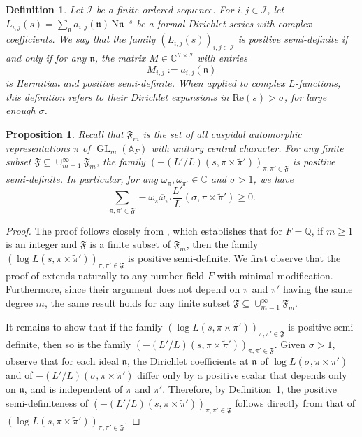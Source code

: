 \documentclass[12pt,reqno]{amsart}
\renewcommand{\tilde}{\widetilde}
\newtheorem{prop}[thm]{Proposition}
\newtheorem{defi}[thm]{Definition}
\theoremstyle{remark}
\renewcommand{\tilde}{\widetilde}
\DeclareMathOperator{\GL}{GL}
\renewcommand{\tilde}{\widetilde}
\renewcommand{\Re}{\mathrm{Re}}
\newcommand{\N}{\mathrm{N}}
\newcommand{\kn}{\mathfrak{n}}
\numberwithin{equation}{section}
\begin{document}
   \begin{defi}\label{def:nonneg-def}
Let $\mathcal{I}$ be a finite ordered sequence. For $i, j \in \mathcal{I}$, let $L_{i,j}(s) = \sum_{\kn} a_{i,j}(\kn)\, \N\kn^{-s}$ be a formal Dirichlet series with complex coefficients.
We say that the family $(L_{i,j}(s))_{i,j \in \mathcal{I}}$ is \emph{positive semi-definite} if and only if for any $\kn$, the matrix $M \in \mathbb{C}^{\mathcal{I} \times\mathcal{I}}$ with entries
\[
    M_{i, j} := a_{i, j}(\kn)
\]
is Hermitian and positive semi-definite. When applied to complex $L$-functions, this definition refers to their Dirichlet expansions in
$\Re(s) > \sigma$, for large enough $\sigma$.
\end{defi}
    \begin{prop}\label{prop:Lichtman-Pascadi} Recall that $\mathfrak{F}_m$ is the set of all cuspidal automorphic representations $\pi$ of $\GL_m(\mathbb{A}_{F})$ with unitary central character. For any finite subset $\mathfrak{F} \subseteq \cup_{m=1}^{\infty} \mathfrak{F}_m$, the family $( -(L'/L)(s, \pi \times \tilde{\pi}'))_{\pi,\pi' \in \mathfrak{F}}$ is positive semi-definite. In particular, for any $\omega_{\pi}, \omega_{\pi'} \in \mathbb{C}$ and $\sigma > 1$, we have
    \begin{equation*}
        \sum_{\pi, \pi' \in \mathfrak{F}} -\omega_{\pi}\overline{\omega}_{\pi'} \frac{L'}{L}(\sigma,\pi \times\tilde{\pi}') \ge 0.
    \end{equation*}
    \end{prop}
    \begin{proof}
        The proof follows closely from \cite[Proposition 4]{LP}, which establishes that for $F= \mathbb{Q}$, if $m \ge 1$ is an integer and $\mathfrak{F}$ is a finite subset of $\mathfrak{F}_m$, then the family $(\log L(s, \pi \times \tilde{\pi}'))_{\pi, \pi' \in \mathfrak{F}}$ is positive semi-definite. We first observe that the proof of \cite[Proposition 4]{LP} extends naturally to any number field $F$ with minimal modification. Furthermore, since their argument does not depend on $\pi$ and $\pi'$ having the same degree $m$, the same result holds for any finite subset $\mathfrak{F} \subseteq \cup_{m=1}^{\infty} \mathfrak{F}_m$. 

        It remains to show that if the family $(\log L(s, \pi \times \tilde{\pi}'))_{\pi, \pi' \in \mathfrak{F}}$ is positive semi-definite, then so is the family $(-({L'}/{L})(s, \pi \times \tilde{\pi}'))_{\pi, \pi' \in \mathfrak{F}}$. Given $\sigma > 1$, observe that for each ideal $\mathfrak{n}$, the Dirichlet coefficients at $\mathfrak{n}$ of $\log L(\sigma, \pi \times \tilde{\pi}')$ and of $-({L'}/{L})(\sigma, \pi \times \tilde{\pi}')$ differ only by a positive scalar that depends only on $\mathfrak{n}$, and is independent of $\pi$ and $\pi'$. Therefore, by Definition~\ref{def:nonneg-def}, the positive semi-definiteness of $(-(L'/L)(s, \pi \times \tilde{\pi}'))_{\pi, \pi' \in \mathfrak{F}} $ follows directly from that of $( \log L(s, \pi \times \tilde{\pi}'))_{\pi, \pi' \in \mathfrak{F}} $.
         \end{proof}
        
\end{document}
